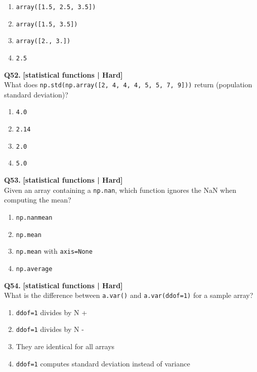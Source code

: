 \begin{enumerate}[label=(\alph*),topsep=2pt,itemsep=1pt,partopsep=0pt,parsep=0pt]
    \item \relax \texttt{array([1.5, 2.5, 3.5])}
    \item \relax \texttt{array([1.5, 3.5])}
    \item \relax \texttt{array([2., 3.])}
    \item \relax \texttt{2.5}
\end{enumerate}
\vspace{2mm}

\noindent\textbf{Q52.} \hfill {\small\color{LPUOrange}\textbf{[statistical functions | Hard]}}\\[2pt]
What does \texttt{np.std(np.array([2, 4, 4, 4, 5, 5, 7, 9]))} return (population standard deviation)?

\begin{enumerate}[label=(\alph*),topsep=2pt,itemsep=1pt,partopsep=0pt,parsep=0pt]
    \item \relax \texttt{4.0}
    \item \relax \texttt{2.14}
    \item \relax \texttt{2.0}
    \item \relax \texttt{5.0}
\end{enumerate}
\vspace{2mm}

\noindent\textbf{Q53.} \hfill {\small\color{LPUOrange}\textbf{[statistical functions | Hard]}}\\[2pt]
Given an array containing a \texttt{np.nan}, which function ignores the NaN when computing the mean?

\begin{enumerate}[label=(\alph*),topsep=2pt,itemsep=1pt,partopsep=0pt,parsep=0pt]
    \item \relax \texttt{np.nanmean}
    \item \relax \texttt{np.mean}
    \item \relax \texttt{np.mean} with \texttt{axis=None}
    \item \relax \texttt{np.average}
\end{enumerate}
\vspace{2mm}

\noindent\textbf{Q54.} \hfill {\small\color{LPUOrange}\textbf{[statistical functions | Hard]}}\\[2pt]
What is the difference between \texttt{a.var()} and \texttt{a.var(ddof=1)} for a sample array?

\begin{enumerate}[label=(\alph*),topsep=2pt,itemsep=1pt,partopsep=0pt,parsep=0pt]
    \item \relax \texttt{ddof=1} divides by N +
    \item \relax \texttt{ddof=1} divides by N -
    \item \relax They are identical for all arrays
    \item \relax \texttt{ddof=1} computes standard deviation instead of variance
\end{enumerate}
\vspace{2mm}

